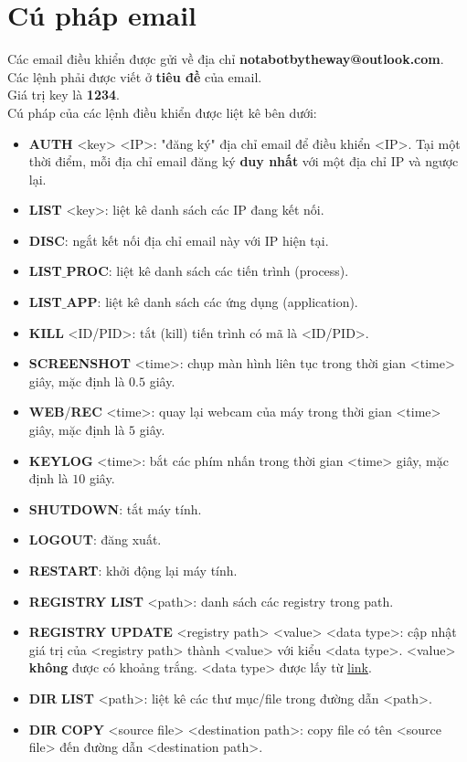 \section{Cú pháp email}
Các email điều khiển được gửi về địa chỉ \textbf{notabotbytheway@outlook.com}.\\ 
Các lệnh phải được viết ở \textbf{tiêu đề} của email.\\
Giá trị key là \textbf{1234}.\\
Cú pháp của các lệnh điều khiển được liệt kê bên dưới:
\begin{itemize}
\item \textbf{AUTH} <key> <IP>: "đăng ký" địa chỉ email để điều khiển <IP>. Tại một thời điểm, mỗi địa chỉ email đăng ký \textbf{duy nhất} với một địa chỉ IP và ngược lại.
\item \textbf{LIST} <key>: liệt kê danh sách các IP đang kết nối.
\item \textbf{DISC}: ngắt kết nối địa chỉ email này với IP hiện tại.
\item \textbf{LIST}$\_$\textbf{PROC}: liệt kê danh sách các tiến trình (process).
\item \textbf{LIST}$\_$\textbf{APP}: liệt kê danh sách các ứng dụng (application).
\item \textbf{KILL} <ID/PID>: tắt (kill) tiến trình có mã là <ID/PID>.
\item \textbf{SCREENSHOT} <time>: chụp màn hình liên tục trong thời gian <time> giây, mặc định là $0.5$ giây.
\item \textbf{WEB}/\textbf{REC} <time>: quay lại webcam của máy trong thời gian <time> giây, mặc định là $5$ giây. 
\item \textbf{KEYLOG} <time>: bắt các phím nhấn trong thời gian <time> giây, mặc định là $10$ giây.
\item \textbf{SHUTDOWN}: tắt máy tính.
\item \textbf{LOGOUT}: đăng xuất. %
\item \textbf{RESTART}: khởi động lại máy tính.
\item \textbf{REGISTRY} \textbf{LIST} <path>: danh sách các registry trong path.
\item \textbf{REGISTRY} \textbf{UPDATE} <registry path> <value> <data type>: cập nhật giá trị của <registry path> thành <value> với kiểu <data type>. <value> \textbf{không} được có khoảng trắng. <data type> được lấy từ \href{https://docs.microsoft.com/en-us/windows/win32/sysinfo/registry-value-types}{link}.
\item \textbf{DIR} \textbf{LIST} <path>: liệt kê các thư mục/file trong đường dẫn <path>.
\item \textbf{DIR} \textbf{COPY} <source file> <destination path>: copy file có tên <source file> đến đường dẫn <destination path>.
\end{itemize}